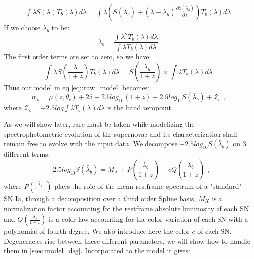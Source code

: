 \documentclass[\docopts]{\docclass}
\begin{document}
\begin{equation}
\begin{split}
\int \lambda S(\lambda) T_b(\lambda) d\lambda = \int \lambda \left( S(\bar\lambda_b ) +(\lambda - \bar\lambda_b )\frac{\partial S(\bar\lambda_b )}{\partial \lambda} \right) T_b(\lambda) d\lambda
\end{split}
\end{equation}
If we choose $\bar\lambda_b $ to be:
\begin{equation}
  \bar\lambda_b  = \frac{\int \lambda^2 T_b(\lambda) d\lambda}{\int \lambda T_b(\lambda) d\lambda}
\end{equation}
The first order terms are set to zero, so we have:
\begin{equation}
\int \lambda S(\frac{\lambda}{1+z}) T_b(\lambda) d\lambda = S(\frac{\bar\lambda_b }{1+z}) \times \int \lambda T_b(\lambda) d\lambda
\end{equation}
Thus our model in eq \ref{eq::raw_model} becomes:          
\begin{equation}
  m_b = \mu(z, \theta_\text{c}) + 25 + 2.5log_{10}(1+z) - 2.5 log_{10} S(\bar\lambda_b ) + \mathcal{Z}_b \text{ ,}
\end{equation}
where $\mathcal{Z}_b = -2.5 log \int \lambda T_b(\lambda) d\lambda$ is the band zeropoint.

As we will show later, care must be taken while modelizing the spectrophotometric evolution of the supernovae and its characterization shall remain free to evolve with the input data.
We decompose $-2.5log_{10}S(\bar\lambda_b)$ on 3 different terms:
\begin{equation}
-2.5log_{10}S(\bar\lambda_b) = M_X + P(\frac{\bar\lambda_b}{1+z}) + cQ(\frac{\bar\lambda_b}{1+z}) \text{ ,}
\end{equation}
where $P(\frac{\bar\lambda_b}{1+z})$ plays the role of the mean restframe spectrum of a "standard" SN Ia, through a decomposition over a third order Spline basis, $M_X$ is a normalization factor accounting for the restframe absolute luminosity of each SN and $Q(\frac{\bar\lambda_b}{1+z})$ is a color law accounting for the color variation of each SN with a polynomial of fourth degree.
We also introduce here the color $c$ of each SN.
Degeneracies rise between these different parameters, we will show how to handle them in \ref{ssec:model_deg}.
Incorporated to the model it gives:
\end{document}
